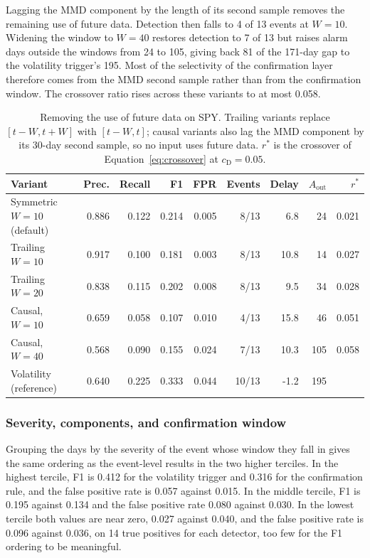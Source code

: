 \documentclass[pdflatex,sn-mathphys-num,iicol]{sn-jnl}
\begin{document}
Lagging the MMD component by the length of its second sample removes the remaining use of future data. Detection then falls to 4 of 13 events at $W=10$. Widening the window to $W=40$ restores detection to 7 of 13 but raises alarm days outside the windows from 24 to 105, giving back 81 of the 171-day gap to the volatility trigger's 195. Most of the selectivity of the confirmation layer therefore comes from the MMD second sample rather than from the confirmation window. The crossover ratio rises across these variants to at most 0.058.

\begin{table}[t]
\centering
\caption{Removing the use of future data on SPY. Trailing variants replace $[t-W,t+W]$ with $[t-W,t]$; causal variants also lag the MMD component by its 30-day second sample, so no input uses future data. $r^{*}$ is the crossover of Equation~\eqref{eq:crossover} at $c_{\mathrm{D}}=0.05$.}
\label{tab:causal}
\scriptsize
\begin{tabular}{lrrrrrrrr}
\toprule
Variant & Prec. & Recall & F1 & FPR & Events & Delay & $A_{\mathrm{out}}$ & $r^{*}$\\
\midrule
Symmetric $W=10$ (default) & 0.886 & 0.122 & 0.214 & 0.005 & 8/13 & 6.8 & 24 & 0.021\\
Trailing $W=10$ & 0.917 & 0.100 & 0.181 & 0.003 & 8/13 & 10.8 & 14 & 0.027\\
Trailing $W=20$ & 0.838 & 0.115 & 0.202 & 0.008 & 8/13 & 9.5 & 34 & 0.028\\
Causal, $W=10$ & 0.659 & 0.058 & 0.107 & 0.010 & 4/13 & 15.8 & 46 & 0.051\\
Causal, $W=40$ & 0.568 & 0.090 & 0.155 & 0.024 & 7/13 & 10.3 & 105 & 0.058\\
Volatility (reference) & 0.640 & 0.225 & 0.333 & 0.044 & 10/13 & -1.2 & 195 & \\
\bottomrule
\end{tabular}
\end{table}

\subsubsection{Severity, components, and confirmation window}
Grouping the days by the severity of the event whose window they fall in gives the same ordering as the event-level results in the two higher terciles. In the highest tercile, F1 is 0.412 for the volatility trigger and 0.316 for the confirmation rule, and the false positive rate is 0.057 against 0.015. In the middle tercile, F1 is 0.195 against 0.134 and the false positive rate 0.080 against 0.030. In the lowest tercile both values are near zero, 0.027 against 0.040, and the false positive rate is 0.096 against 0.036, on 14 true positives for each detector, too few for the F1 ordering to be meaningful.
\end{document}
